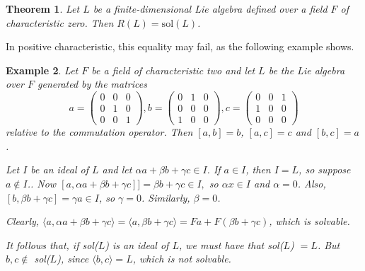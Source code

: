 \documentclass[11pt]{amsart}
\theoremstyle{plain}
\newtheorem{theorem}{Theorem}[section]
\newtheorem{example}[theorem]{Example}
\def\F{\mathbb{F}}
\def\sol{\mathrm{sol}}
\begin{document}



\begin{theorem}\cite[Theorem 2.1]{Thompson}\label{Thompson}
Let $L$ be a finite-dimensional Lie algebra defined over a field $F$ of characteristic zero. Then  $R(L)=\sol(L)$.
\end{theorem}


In positive characteristic, this equality may fail, as the following example shows.

\begin{example}\label{char2}
Let $F$ be a field of characteristic two and let $L$ be the Lie algebra over $F$ generated by the matrices $$a=\left( \begin{array}{ccc} 0&0&0\\
0&1&0\\
0&0&1
\end{array}\right),  b=\left( \begin{array}{ccc} 0&1&0\\
0&0&0\\
1&0&0
\end{array}\right),  c=\left( \begin{array}{ccc} 0&0&1\\
1&0&0\\
0&0&0
\end{array}\right)$$ relative to the commutation operator. Then $[a,b]=b$, $[a,c]=c$ and $[b,c]=a$.

\medskip

\medskip

Let $I$ be an ideal of $L$ and let $\alpha a+\beta b+\gamma c \in I$. If $a\in I$, then $I=L$, so suppose $a\notin I$.. Now $[a,\alpha a+\beta b+\gamma c]]=\beta b+\gamma c\in I,$
so $\alpha x\in I$ and $\alpha=0$. Also, $[b,\beta b+\gamma c]=\gamma a\in I$, so $\gamma=0$. Similarly, $\beta=0$.
\medskip

\medskip

Clearly, $\langle a,\alpha a+\beta b+\gamma c\rangle=\langle a,\beta b+\gamma c\rangle=Fa+F(\beta b+\gamma c)$, which is solvable. 
\medskip

It follows that, if sol($L$) is an ideal of $L$, we must have that sol($L$) $=L$. But $b,c \notin$ sol($L$), since $\langle b,c \rangle=L$, which is not solvable. 
\end{example}
\end{document}
